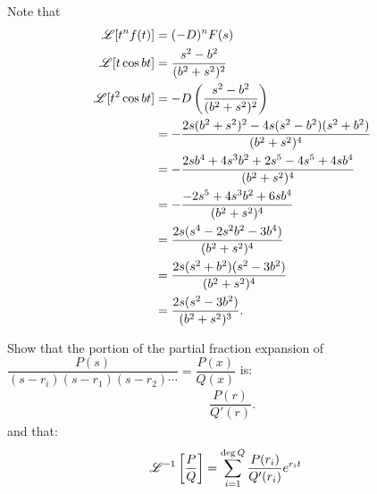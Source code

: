 \documentclass[11pt]{article}
\begin{document}
    \begin{solution} Note that 
        \begin{align}
            \mathscr L [t^n f(t)] &= (-D)^nF(s) \\
            \mathscr L [t \cos bt] &= \dfrac{s^2-b^2}{(b^2+s^2)^2} \\
            \mathscr L [t^2 \cos bt] &= -D \left(\dfrac{s^2-b^2}{(b^2+s^2)^2}\right) \\
            &= -\dfrac{2s(b^2+s^2)^2-4s(s^2-b^2)(s^2+b^2)}{(b^2 + s^2)^4} \\
            &= -\dfrac{2sb^4+4s^3b^2 +2s^5 - 4s^5 +4sb^4}{(b^2+s^2)^4} \\
            &= -\dfrac{-2s^5+4s^3b^2+6sb^4}{(b^2+s^2)^4} \\
            &= \dfrac{2s(s^4-2s^2b^2-3b^4)}{(b^2+s^2)^4} \\
            &= \dfrac{2s(s^2+b^2)(s^2-3b^2)}{(b^2+s^2)^4} \\
            &= \dfrac{2s(s^2-3b^2)}{(b^2+s^2)^3}.
        \end{align}
    \end{solution}
    \newpage
    \begin{problem}
        Show that the portion of the partial fraction expansion of \\ $\dfrac{P(s)}{(s-r_i)(s-r_1)(s-r_2) \cdots} = \dfrac{P(x)}{Q(x)}$ is:
        \begin{align}
            \dfrac{P(r)}{Q'(r)}.
        \end{align}
        and that:
        \begin{align}
            \mathscr L^{-1} \left[\dfrac{P}{Q}\right] &= \sum_{i=1}^{\deg Q} \dfrac{P(r_i)}{Q'(r_i)}e^{r_it}
        \end{align}
    \end{problem}
\end{document}
